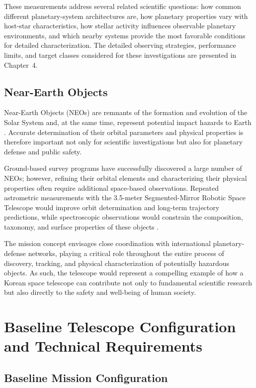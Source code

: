 These measurements address several related scientific questions: how common
different planetary-system architectures are, how planetary properties vary
with host-star characteristics, how stellar activity influences observable
planetary environments, and which nearby systems provide the most favorable
conditions for detailed characterization. The detailed observing strategies,
performance limits, and target classes considered for these investigations
are presented in Chapter~4.

\section{Near-Earth Objects}

Near-Earth Objects (NEOs) are remnants of the formation and evolution of the Solar System and, at the same time, represent potential impact hazards to Earth \cite{mainzer2011}. Accurate determination of their orbital parameters and physical properties is therefore important not only for scientific investigations but also for planetary defense and public safety.

Ground-based survey programs have successfully discovered a large number of NEOs; however, refining their orbital elements and characterizing their physical properties often require additional space-based observations. Repeated astrometric measurements with the 3.5-meter Segmented-Mirror Robotic Space Telescope would improve orbit determination and long-term trajectory predictions, while spectroscopic observations would constrain the composition, taxonomy, and surface properties of these objects \cite{nasa2023}.

The mission concept envisages close coordination with international planetary-defense networks, playing a critical role throughout the entire process of discovery, tracking, and physical characterization of potentially hazardous objects. As such, the telescope would represent a compelling example of how a Korean space telescope can contribute not only to fundamental scientific research but also directly to the safety and well-being of human society.

\chapter{Baseline Telescope Configuration and Technical Requirements}

\section{Baseline Mission Configuration}


